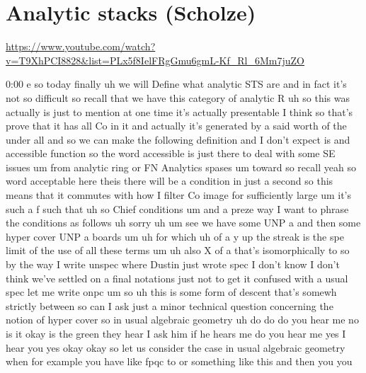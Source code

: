 
\section{\ufs Analytic stacks (Scholze)}

\url{https://www.youtube.com/watch?v=T9XhPCI8828&list=PLx5f8IelFRgGmu6gmL-Kf_Rl_6Mm7juZO}
\renewcommand{\yt}[2]{\href{https://www.youtube.com/watch?v=T9XhPCI8828&list=PLx5f8IelFRgGmu6gmL-Kf_Rl_6Mm7juZO&t=#1}{#2}}
\vspace{1em}

\begin{unfinished}{0:00}
  e
so  today
finally  uh  we  will  Define  what  analytic
STS
are
and  in  fact  it's  not  so  difficult
so  recall  that  we  have  this  category  of
analytic
R  uh  so  this  was  actually  is  just  to
mention  at  one  time  it's  actually
presentable  I  think
so  that's  prove  that  it  has  all  Co  in  it
and  actually  it's  generated
by  a  said  worth  of  the  under
all  and  so  we  can  make  the  following
definition  and  I  don't  expect
is
and  accessible
function  so  the  word  accessible  is  just
there  to  deal  with  some  SE  issues
um  from  analytic  ring
or  FN  Analytics  spases
um
toward  so  recall  yeah  so  word  acceptable
here  theis  there  will  be  a  condition  in
just  a  second  so  this  means  that  it
commutes
with  how  I  filter  Co  image  for
sufficiently
large
um  it's  such  a  f  such  that  uh  so  Chief
conditions  um  and  a  preze  way  I  want  to
phrase  the  conditions  as
follows
uh  sorry
uh
um  see  we  have
some  UNP  a  and  then  some  hyper  cover  UNP
a  boards
um  uh  for  which
uh  of
a  y  up  the  streak  is  the  spe  limit  of
the  use  of  all  these
terms
um  uh  also  X  of  a  that's  isomorphically
to
so  by  the
way  I  write  unspec  where  Dustin  just
wrote  spec  I  don't  know  I  don't  think
we've  settled  on  a  final
notations  just  not  to  get  it  confused
with  a  usual  spec  let  me  write  onpc
um  so  uh  this  is  some  form  of  descent
that's  somewh  strictly  between
so  can  I  ask  just  a  minor  technical
question  concerning  the  notion  of  hyper
cover  so  in  usual  algebraic
geometry  uh  do  do  do  you  hear  me  no  is
it  okay  is  the  green  they  hear  I  ask  him
if  he  hears  me  do  you  hear  me  yes  I  hear
you  yes  okay  okay  so  let  us  consider  the
case  in  usual  algebraic  geometry  when
for  example  you  have  like  fpqc  to  or
something  like  this  and  then  you  you

\end{unfinished}
